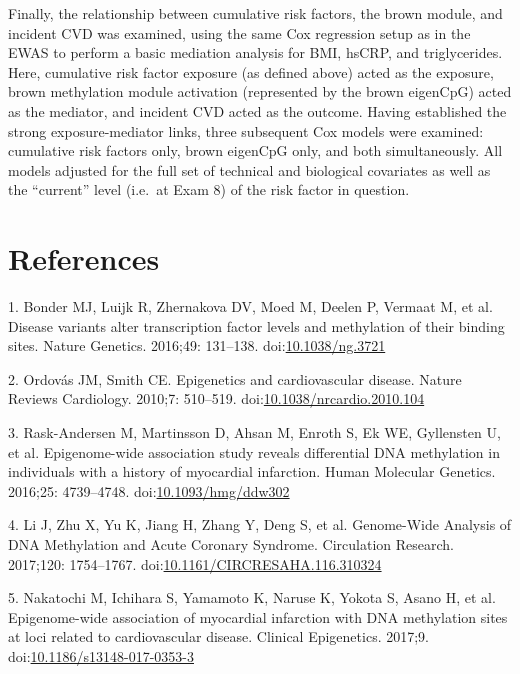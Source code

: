 \documentclass[]{article}
\theoremstyle{definition}
\theoremstyle{definition}
\theoremstyle{definition}
\theoremstyle{remark}
\begin{document}
Finally, the relationship between cumulative risk factors, the brown
module, and incident CVD was examined, using the same Cox regression
setup as in the EWAS to perform a basic mediation analysis for BMI,
hsCRP, and triglycerides. Here, cumulative risk factor exposure (as
defined above) acted as the exposure, brown methylation module
activation (represented by the brown eigenCpG) acted as the mediator,
and incident CVD acted as the outcome. Having established the strong
exposure-mediator links, three subsequent Cox models were examined:
cumulative risk factors only, brown eigenCpG only, and both
simultaneously. All models adjusted for the full set of technical and
biological covariates as well as the ``current'' level (i.e.~at Exam 8)
of the risk factor in question.

\section{References}\label{references}


1. Bonder MJ, Luijk R, Zhernakova DV, Moed M, Deelen P, Vermaat M, et
al. Disease variants alter transcription factor levels and methylation
of their binding sites. Nature Genetics. 2016;49: 131--138.
doi:\href{http://dx.doi.org/10.1038/ng.3721}{10.1038/ng.3721}

2. Ordov{á}s JM, Smith CE. Epigenetics and cardiovascular disease.
Nature Reviews Cardiology. 2010;7: 510--519.
doi:\href{http://dx.doi.org/10.1038/nrcardio.2010.104}{10.1038/nrcardio.2010.104}

3. Rask-Andersen M, Martinsson D, Ahsan M, Enroth S, Ek WE, Gyllensten
U, et al. Epigenome-wide association study reveals differential DNA
methylation in individuals with a history of myocardial infarction.
Human Molecular Genetics. 2016;25: 4739--4748.
doi:\href{http://dx.doi.org/10.1093/hmg/ddw302}{10.1093/hmg/ddw302}

4. Li J, Zhu X, Yu K, Jiang H, Zhang Y, Deng S, et al. Genome-Wide
Analysis of DNA Methylation and Acute Coronary Syndrome. Circulation
Research. 2017;120: 1754--1767.
doi:\href{http://dx.doi.org/10.1161/CIRCRESAHA.116.310324}{10.1161/CIRCRESAHA.116.310324}

5. Nakatochi M, Ichihara S, Yamamoto K, Naruse K, Yokota S, Asano H, et
al. Epigenome-wide association of myocardial infarction with DNA
methylation sites at loci related to cardiovascular disease. Clinical
Epigenetics. 2017;9.
doi:\href{http://dx.doi.org/10.1186/s13148-017-0353-3}{10.1186/s13148-017-0353-3}
\end{document}
